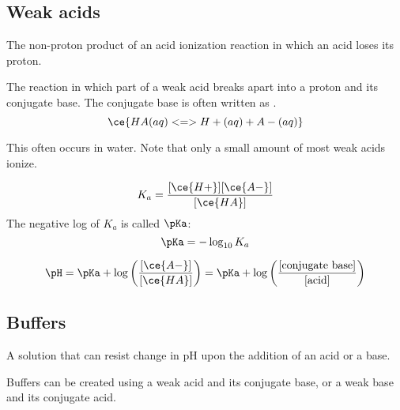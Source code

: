 \subsection{Weak acids}

\begin{definition}
  The non-proton product of an acid ionization reaction in which an acid loses its proton.
\end{definition}

\begin{definition}
  The reaction in which part of a weak acid breaks apart into a proton and its conjugate base. The conjugate base is often written as .
  \[
    \ce{HA(aq) <=> H+(aq) + A-(aq)}
  \]

  This often occurs in water. Note that only a small amount of most weak acids ionize.
\end{definition}


\begin{definition}
  \[
    K_a = \frac{[\ce{H+}][\ce{A-}]}{[\ce{HA}]}
  \]
  The negative log of $K_a$ is called $\pKa$:
  \[
    \pKa = - \log_{10} K_a
  \]
\end{definition}

\begin{theorem}
  \[
    \pH = \pKa + \log \left(\frac{[\ce{A-}]}{[\ce{HA}]}\right) = \pKa + \log \left(\frac{[\text{conjugate base}]}{[\text{acid}]}\right)
  \]
\end{theorem}

\subsection{Buffers}

\begin{definition}[Buffer]
  A solution that can resist change in pH upon the addition of an acid or a base.
\end{definition}

Buffers can be created using a weak acid and its conjugate base, or a weak base and its conjugate acid.






